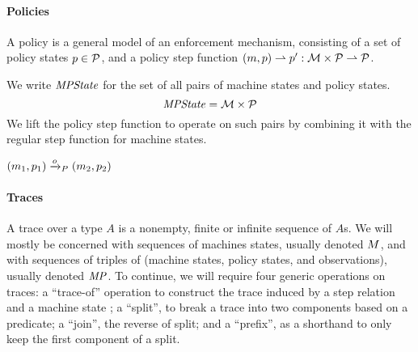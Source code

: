 \documentclass[acmsmall,review,anonymous]{acmart}\settopmatter{printfolios=true,printccs=false,printacmref=false}
\begin{document}
\paragraph*{Policies}

A policy is a general model of an enforcement mechanism, consisting of
a set of policy states \(p \in \mathcal{P}\), and a policy step function
\((m, p) \rightharpoonup p' : {\mathcal M} \times \mathcal{P}
\rightharpoonup \mathcal{P}\).

We write $\mathit{MPState}$ for the set of all pairs of machine states and policy
states.
%
\[\mathit{MPState} = {\mathcal M} \times \mathcal{P}\]
%
We lift the policy step function to operate on such pairs
by combining it with the regular step function for machine states.

            {\((m_1,p_1) \xrightarrow{o}_P (m_2,p_2)\)}




\paragraph{Traces}

A trace over a type $A$ is a nonempty, finite or infinite
sequence of $A$s. We will mostly be concerned with sequences of
machines states, usually denoted $M$, and with sequences of
triples of (machine states, policy states, and observations), usually
denoted $\mathit{MP}$.
To continue, we will require four generic operations
on traces: a ``trace-of'' operation to construct the
trace induced by a step relation and a machine state
;
a ``split'', to break a
trace into two components based on a predicate; a ``join'', the
reverse of split; and a ``prefix'', as a shorthand to only keep the
first component of a split.  
\end{document}
